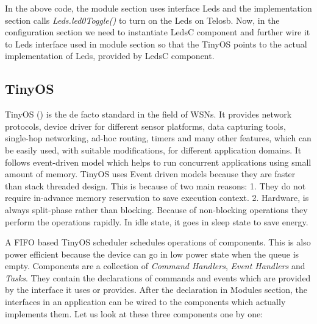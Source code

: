     \par
    
    In the above code, the module section uses interface Leds and the implementation section calls \textit{Leds.led0Toggle()} to turn on the Leds on Telosb. Now, in the configuration section we need to instantiate LedsC component and further wire it to Leds interface used in module section so that the TinyOS points to the actual implementation of Leds, provided by LedsC component.

    \subsection*{TinyOS}
    
    TinyOS (\cite{website:TINYOS}) is the de facto standard in the field of \acp{WSN}. It provides network protocols, device driver for different sensor platforms, data capturing tools, single-hop networking, ad-hoc routing, timers and many other features, which can be easily used, with suitable modifications, for different application domains. It follows event-driven model which helps to run concurrent applications using small amount of memory. TinyOS uses Event driven models because they are faster than stack threaded design. This is because of two main reasons: 1. They do not require in-advance memory reservation to save execution context. 2. Hardware, is always split-phase rather than blocking. Because of non-blocking operations they perform the operations rapidly. In idle state, it goes in sleep state to save energy.
    
    \par
    A \ac{FIFO} based TinyOS scheduler schedules operations of components. This is also power efficient because the device can go in low power state when the queue is empty. Components are a collection of \textit{Command Handlers}, \textit{Event Handlers} and \textit{Tasks}. They contain the declarations of commands and events which are provided by the interface it uses or provides. After the declaration in Modules section, the interfaces in an application can be wired to the components which actually implements them. Let us look at these three components one by one:
    
